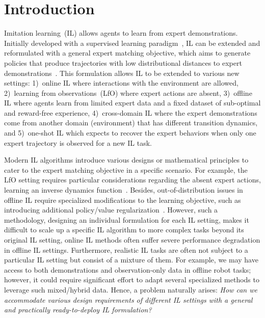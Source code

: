 
\section{Introduction}
Imitation learning~(IL) allows agents to learn from expert demonstrations. 
Initially developed with a supervised learning paradigm~\citep{pomerleau1991efficient, schaal1996learning}, IL can be extended and reformulated with a general {expert matching objective}, which aims to generate policies that produce trajectories with low distributional distances to expert demonstrations~\citep{ho2016generative}.
%
This formulation allows IL to be extended to various new settings: 1)~online IL where interactions with the environment are allowed, 2)~{learning from observations~(LfO)} where expert actions are absent, 3)~{offline IL where agents learn from limited expert data and a fixed dataset of {sub-optimal and reward-free} experience}, 4)~{cross-domain IL} where the expert demonstrations come from another domain (\ie environment) that has different transition dynamics, and 5)~one-shot IL which expects to recover the expert behaviors when only one expert trajectory is observed for a new IL task.


Modern IL algorithms introduce various designs or mathematical principles to cater to the expert matching objective in a specific scenario. 
%
For example, the LfO setting requires particular considerations regarding the absent expert actions, \eg learning an inverse dynamics function~\citep{baker2022video, torabi2018behavioral}.
%
Besides, out-of-distribution issues in offline IL require specialized modifications to the learning objective, such as introducing additional policy/value regularization~\citep{jarboui2021offline, yue2023clare}.  
%
However, such a methodology, designing an individual formulation for each IL setting, makes it difficult to scale up a specific IL algorithm to more complex tasks beyond its original IL setting, \eg online IL methods often suffer severe performance degradation in offline IL settings. 
Furthermore, realistic IL tasks are often not subject to a particular IL setting but consist of a mixture of them. For example, we may have access to both demonstrations and observation-only data in offline robot tasks; however, it could require significant effort to adapt several specialized methods to leverage such mixed/hybrid data. Hence, a problem naturally arises: \textit{How can we accommodate various design requirements of different IL settings with a general and practically ready-to-deploy IL formulation?} 

